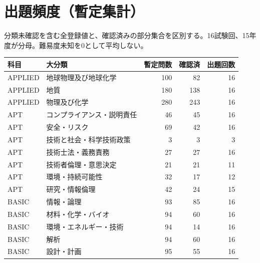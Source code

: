 \chapter{出題頻度（暫定集計）}
分類未確認を含む全登録値と、確認済みの部分集合を区別する。16試験回、15年度が分母。難易度未知を0として平均しない。
\begin{longtable}{p{.16\linewidth}p{.42\linewidth}rrr}
科目 & 大分類 & 暫定問数 & 確認済 & 出題回数\\\hline
APPLIED & 地球物理及び地球化学 & 100 & 82 & 16\\
APPLIED & 地質 & 180 & 138 & 16\\
APPLIED & 物理及び化学 & 280 & 243 & 16\\
APT & コンプライアンス・説明責任 & 46 & 45 & 16\\
APT & 安全・リスク & 69 & 42 & 16\\
APT & 技術と社会・科学技術政策 & 3 & 3 & 3\\
APT & 技術士法・義務責務 & 27 & 27 & 16\\
APT & 技術者倫理・意思決定 & 21 & 21 & 11\\
APT & 環境・持続可能性 & 32 & 17 & 12\\
APT & 研究・情報倫理 & 42 & 24 & 15\\
BASIC & 情報・論理 & 93 & 85 & 16\\
BASIC & 材料・化学・バイオ & 94 & 60 & 16\\
BASIC & 環境・エネルギー・技術 & 94 & 14 & 16\\
BASIC & 解析 & 94 & 60 & 16\\
BASIC & 設計・計画 & 95 & 55 & 16\\
\end{longtable}
